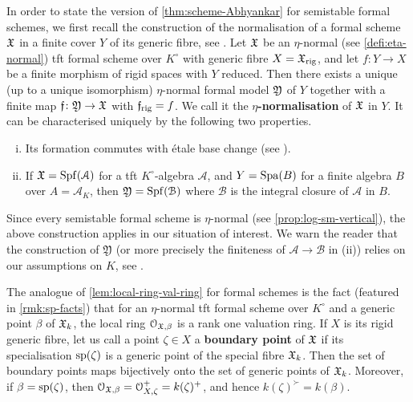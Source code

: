 In order to state the version of \cref{thm:scheme-Abhyankar} for semistable formal schemes, we first recall the construction of the normalisation of a formal scheme ${\mathfrak{X}}$ in a finite cover $Y$ of its generic fibre, see \cite[Lemma~4.1]{AchingerLaraYoucis2022}. Let ${\mathfrak{X}}$ be an $\eta$-normal (see \cref{defi:eta-normal}) tft formal scheme over $K^\circ$ with generic fibre $X = {\mathfrak{X}}_{\rm rig}$, and let $f\colon Y\to X$ be a finite morphism of rigid spaces with $Y$ reduced. Then there exists a unique (up to a unique isomorphism) $\eta$-normal formal model ${\mathfrak{Y}}$ of $Y$ together with a finite map $\mathfrak{f}\colon {\mathfrak{Y}}\to {\mathfrak{X}}$ with $\mathfrak{f}_{\rm rig} = f$. We call it the {\bf $\eta$-normalisation} of ${\mathfrak{X}}$ in $Y$. It can be characterised uniquely by the following two properties.
\begin{enumerate}[(i)]
    \item Its formation commutes with \'etale base change (see \cite[Appendix~A]{AchingerLaraYoucis2022}).
    \item If ${\mathfrak{X}} = \operatorname{Spf}(\mathcal{A})$ for a tft $K^\circ$-algebra $\mathcal{A}$, and $Y = \operatorname{Spa}(B)$ for a finite algebra $B$ over $A = \mathcal{A}_K$, then ${\mathfrak{Y}} = \operatorname{Spf}(\mathcal{B})$ where $\mathcal{B}$ is the integral closure of $\mathcal{A}$ in $B$. 
\end{enumerate}
Since every semistable formal scheme is $\eta$-normal (see \cref{prop:log-sm-vertical}), the above construction applies in our situation of interest. We warn the reader that the construction of $\mathfrak{Y}$ (or more precisely the finiteness of $\mathcal{A}\to\mathcal{B}$ in (ii)) relies on our assumptions on $K$, see \cite[Remark~4.3]{AchingerLaraYoucis2022}.

The analogue of \cref{lem:local-ring-val-ring} for formal schemes is the fact (featured in \cref{rmk:sp-facts}) that for an $\eta$-normal tft formal scheme over $K^\circ$ and a generic point $\beta$ of ${\mathfrak{X}}_k$, the local ring ${\mathcal O}_{{\mathfrak{X}},\beta}$ is a rank one valuation ring. If $X$ is its rigid generic fibre, let us call a point $\zeta\in X$ a {\bf boundary point} of ${\mathfrak{X}}$ if its specialisation ${\rm sp}(\zeta)$ is a generic point of the special fibre ${\mathfrak{X}}_k$. Then the set of boundary points maps bijectively onto the set of generic points of ${\mathfrak{X}}_k$. Moreover, if $\beta = {\rm sp}(\zeta)$, then ${\mathcal O}_{{\mathfrak{X}},\beta}={\mathcal O}_{X,\zeta}^+=k(\zeta)^+$, and hence $k(\zeta)^\succ = k(\beta)$.

